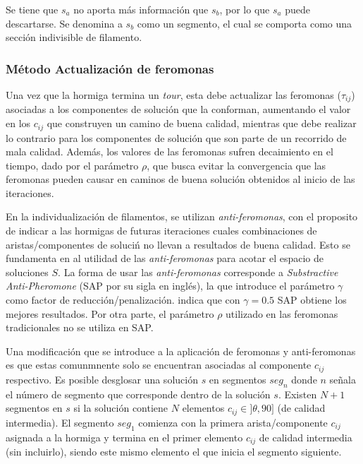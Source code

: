 Se tiene que $s_a$ no aporta m\'as informaci\'on que $s_b$, por lo que $s_a$ puede descartarse. Se denomina a $s_b$ como un segmento, el cual se comporta como una secci\'on indivisible de filamento.

    
\subsubsection{M\'etodo Actualizaci\'on de feromonas}
\label{subsec:pheroUpdate}
Una vez que la hormiga termina un {\it tour}, esta debe actualizar las feromonas ($\tau_{ij}$) asociadas a los componentes de soluci\'on que la conforman, aumentando el valor en los $c_{ij}$ que construyen un camino de buena calidad, mientras que debe realizar lo contrario para los componentes de soluci\'on que son parte de un recorrido de mala calidad. Adem\'as, los valores de las feromonas sufren decaimiento en el tiempo, dado por el par\'ametro $\rho$, que busca evitar la convergencia que las feromonas pueden causar en caminos de buena soluci\'on obtenidos al inicio de las iteraciones.


En la individualizaci\'on de filamentos, se utilizan {\it anti-feromonas}, con el proposito de indicar a las hormigas de futuras iteraciones cuales combinaciones de aristas/componentes de soluci\'n no llevan a resultados de buena calidad. Esto se fundamenta en al utilidad de las {\it anti-feromonas} para acotar el espacio de soluciones $S$. La forma de usar las {\it anti-feromonas} corresponde a {\it Substractive Anti-Pheromone} (SAP por su sigla en ingl\'es), la que introduce el par\'ametro $\gamma$ como factor de reducci\'on/penalizaci\'on. \cite{montgomery2002anti} indica que con $\gamma = 0.5$ SAP obtiene los mejores resultados. Por otra parte, el par\'ametro $\rho$ utilizado en las feromonas tradicionales no se utiliza en SAP.


Una modificaci\'on que se introduce a la aplicaci\'on de  feromonas y anti-feromonas es que estas comunmnente solo se encuentran asociadas al componente $c_{ij}$ respectivo. Es posible desglosar una soluci\'on $s$ en segmentos $seg_{n}$ donde $n$ se\~nala el n\'umero de segmento que corresponde dentro de la soluci\'on $s$. Existen $N + 1$ segmentos en $s$ si la soluci\'on contiene $N$ elementos $c_{ij} \in ]\theta, 90]$ (de calidad intermedia). El segmento $seg_1$ comienza con la primera arista/componente $c_{ij}$ asignada a la hormiga y termina en el primer elemento $c_{ij}$ de calidad intermedia (sin incluirlo), siendo este mismo elemento el que inicia el segmento siguiente.


